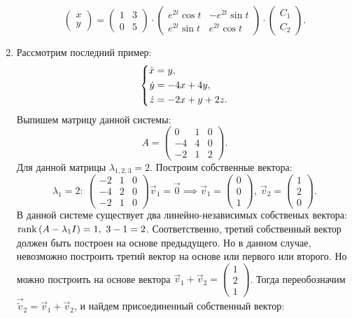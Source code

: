 \begin{enumerate}
				\[ \begin{pmatrix} x \\ y \end{pmatrix} = \begin{pmatrix} 1 & 3 \\ 0 & 5 \end{pmatrix} \cdot \begin{pmatrix} e^{2t}\cos{t} & -e^{2t}\sin{t} \\ e^{2t}\sin{t} & e^{2t}\cos{t} \end{pmatrix} \cdot \begin{pmatrix} C_1 \\ C_2 \end{pmatrix}. \]

			\item Рассмотрим последний пример:
				\[ \left\lbrace \begin{aligned} \dot{x} &= y, \\ \dot{y} &= -4x + 4y, \\ \dot{z} &= -2x + y + 2z. \end{aligned} \right. \]
				Выпишем матрицу данной системы:
				\[ A = \begin{pmatrix} 0 & 1 & 0 \\ -4 & 4 & 0 \\ -2 & 1 & 2 \end{pmatrix}. \]
				Для данной матрицы $\lambda_{1, 2, 3} = 2$. Построим собственные вектора:
				\[ \lambda_1 = 2: ~ \begin{pmatrix} -2 & 1 & 0 \\ -4 & 2 & 0 \\ -2 & 1 & 0 \end{pmatrix} \vec{v}_1 = \vec{0} \implies \vec{v}_1 = \begin{pmatrix} 0 \\ 0 \\ 1 \end{pmatrix}, ~ \vec{v}_2 = \begin{pmatrix} 1 \\ 2 \\ 0 \end{pmatrix}. \]
				В данной системе существует два линейно-независимых собственых вектора: \( \operatorname{rank}\left( A - \lambda_1 I \right) = 1, ~ 3 - 1 = 2 \). Соответственно, третий собственный вектор должен быть построен на основе предыдущего. Но в данном случае, невозможно построить третий вектор на основе или первого или второго. Но можно построить на основе вектора $\vec{v}_1 + \vec{v}_2 = \begin{pmatrix} 1 \\ 2 \\ 1 \end{pmatrix}$. Тогда переобозначим $\vec{\tilde{v}}_2 = \vec{v}_1 + \vec{v}_2$, и найдем присоединенный собственный вектор:

\end{enumerate}
